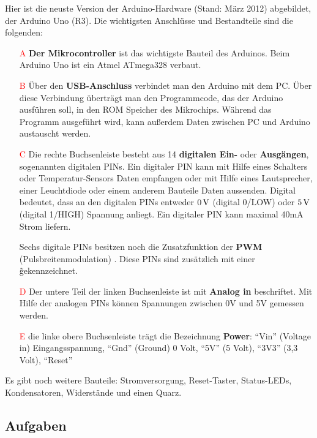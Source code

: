 Hier ist die neuste Version der Arduino-Hardware (Stand: März 2012) abgebildet, der Arduino 
Uno (R3). Die wichtigsten Anschlüsse und Bestandteile sind die folgenden:
\begin{itemize}
\item[\textcolor{red}{A}] \textbf{Der Mikrocontroller} ist das wichtigste Bauteil des Arduinos. Beim Arduino Uno ist ein Atmel ATmega328 verbaut. 


\item[\textcolor{red}{B}] 
Über den \textbf{USB-Anschluss} verbindet man den Arduino mit dem PC. Über diese Verbindung überträgt man den Programmcode, das der Arduino ausführen soll, in den ROM Speicher des Mikrochips. Während das Programm ausgeführt wird, kann außerdem Daten zwischen PC und Arduino austauscht werden.

\item[\textcolor{red}{C}] 
Die rechte Buchsenleiste besteht aus 14 \textbf{digitalen Ein-} oder \textbf{Ausgängen}, sogenannten digitalen PINs. Ein digitaler PIN kann mit Hilfe eines Schalters oder Temperatur-Sensors Daten empfangen oder mit Hilfe eines Lautsprecher, einer Leuchtdiode oder einem anderem Bauteile Daten aussenden. Digital bedeutet, dass an den digitalen PINs entweder $0\operatorname{V}$ (digital 0/LOW) oder $5\operatorname{V}$ (digital 1/HIGH) Spannung anliegt. Ein digitaler PIN kann maximal 40mA Strom liefern.

Sechs digitale PINs besitzen noch die Zusatzfunktion der \textbf{PWM} (Pulsbreitenmodulation) . Diese PINs sind zusätzlich mit einer  \~  gekennzeichnet. 

\item[\textcolor{red}{D}] Der untere Teil der linken Buchsenleiste ist mit \textbf{Analog in} beschriftet. Mit Hilfe der analogen PINs können Spannungen zwischen 0V und 5V gemessen werden.

\item[\textcolor{red}{E}] 
die linke obere Buchsenleiste trägt die Bezeichnung \textbf{Power}:
   ``Vin'' (Voltage in) Eingangsspannung, ``Gnd'' (Ground)  0 Volt, ``5V'' (5 Volt), ``3V3'' (3,3 Volt), ``Reset''
\end{itemize}
Es gibt noch weitere Bauteile: Stromversorgung, Reset-Taster, Status-LEDs, Kondensatoren, Widerstände und einen Quarz.
 
\subsection{Aufgaben}

